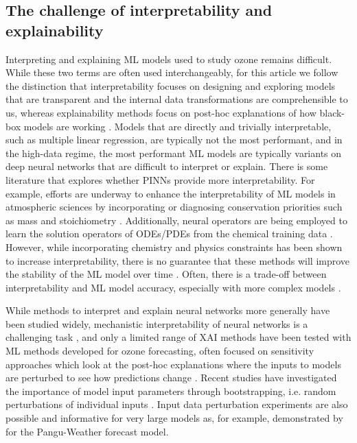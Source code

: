 \documentclass[gmd, manuscript]{copernicus}
\begin{document}
\subsection{The challenge of interpretability and explainability}
Interpreting and explaining ML models used to study ozone remains difficult. While these two terms are often used interchangeably, for this article we follow the distinction that interpretability focuses on designing and exploring models that are transparent and the internal data transformations are comprehensible to us, whereas explainability methods focus on post-hoc explanations of how black-box models are working \citep{Rudin2019}. Models that are directly and trivially interpretable, such as multiple linear regression, are typically not the most performant, and in the high-data regime, the most performant ML models are typically variants on deep neural networks that are difficult to interpret or explain. There is some literature that explores whether PINNs provide more interpretability. For example, efforts are underway to enhance the interpretability of ML models in atmospheric sciences by incorporating or diagnosing conservation priorities such as mass and stoichiometry \citep{sturm_mass-_2020, sturm_conservation_2022}. Additionally, neural operators are being employed to learn the solution operators of ODEs/PDEs from the chemical training data \citep{liu_neural_2024}. However, while incorporating chemistry and physics constraints has been shown to increase interpretability, there is no guarantee that these methods will improve the stability of the ML model over time \citep{sturm_advecting_2023}. Often, there is a trade-off between interpretability and ML model accuracy, especially with more complex models \citep{sengupta_balancing_2023}.

While methods to interpret and explain neural networks more generally have been studied widely, mechanistic interpretability of neural networks is a challenging task \citep{Nanda2023}, and only a limited range of XAI methods have been tested with ML methods developed for ozone forecasting, often focused on sensitivity approaches which look at the post-hoc explanations where the inputs to models are perturbed to see how predictions change \citep{Ivanovs2021}. Recent studies have investigated the importance of model input parameters through bootstrapping, i.e. random perturbations of individual inputs \citep{Kleinert2021}. Input data perturbation experiments are also possible and informative for very large models as, for example, demonstrated by \citet{Hakim2024} for the Pangu-Weather forecast model.
\end{document}
